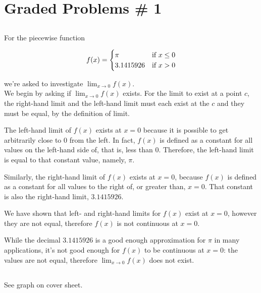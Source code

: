\documentclass{article}
\begin{document}
\section{Graded Problems \# 1}

\subsection{}

For the piecewise function

$$
f(x) =
\begin{cases}
  \pi & \textnormal{if } x \leq 0 \\
  3.1415926 & \textnormal{if } x > 0
\end{cases}
$$

\noindent
we're asked to investigate $ \lim_{x \to 0} f(x)$.
\\

We begin by asking if $ \lim_{x \to 0} f(x)$ exists. For the limit to exist at a point $c$, the right-hand limit and the left-hand limit must each exist at the $c$ and they must be equal, by the definition of limit.

The left-hand limit of $f(x)$ exists at $x=0$ because it is possible to get arbitrarily close to $0$ from the left. In fact, $f(x)$ is defined as a constant for all values on the left-hand side of, that is, less than $0$.
Therefore, the left-hand limit is equal to that constant value, namely, $\pi$.

Similarly, the right-hand limit of $f(x)$ exists at $x=0$, because $f(x)$ is defined as a constant for all values to the right of, or greater than, $x=0$. That constant is also the right-hand limit, $3.1415926$.

We have shown that left- and right-hand limits for $f(x)$ exist at $x=0$, however they are not equal, therefore $f(x)$ is not continuous at $x=0$.

While the decimal $3.1415926$ is a good enough approximation for $\pi$ in many
applications, it's not good enough for $f(x)$ to be continuous at $x=0$:
the values are not equal, therefore $\lim_{x \to 0} f(x)$ does not exist.




\subsection{}
See graph on cover sheet.
\end{document}
